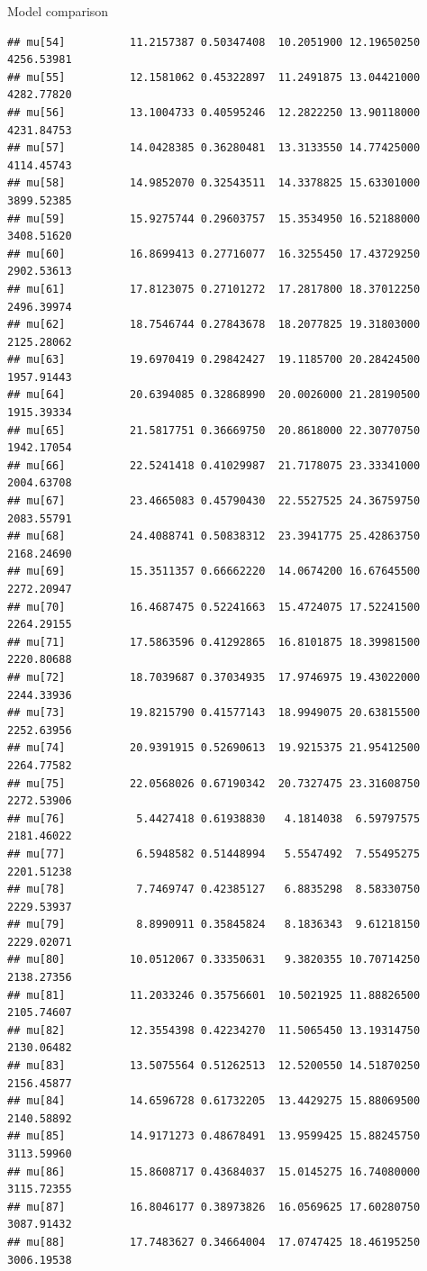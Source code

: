 \documentclass[
  ignorenonframetext,
]{beamer}
\begin{document}
\begin{frame}[fragile]{Model comparison}
\begin{verbatim}
## mu[54]          11.2157387 0.50347408  10.2051900 12.19650250 4256.53981
## mu[55]          12.1581062 0.45322897  11.2491875 13.04421000 4282.77820
## mu[56]          13.1004733 0.40595246  12.2822250 13.90118000 4231.84753
## mu[57]          14.0428385 0.36280481  13.3133550 14.77425000 4114.45743
## mu[58]          14.9852070 0.32543511  14.3378825 15.63301000 3899.52385
## mu[59]          15.9275744 0.29603757  15.3534950 16.52188000 3408.51620
## mu[60]          16.8699413 0.27716077  16.3255450 17.43729250 2902.53613
## mu[61]          17.8123075 0.27101272  17.2817800 18.37012250 2496.39974
## mu[62]          18.7546744 0.27843678  18.2077825 19.31803000 2125.28062
## mu[63]          19.6970419 0.29842427  19.1185700 20.28424500 1957.91443
## mu[64]          20.6394085 0.32868990  20.0026000 21.28190500 1915.39334
## mu[65]          21.5817751 0.36669750  20.8618000 22.30770750 1942.17054
## mu[66]          22.5241418 0.41029987  21.7178075 23.33341000 2004.63708
## mu[67]          23.4665083 0.45790430  22.5527525 24.36759750 2083.55791
## mu[68]          24.4088741 0.50838312  23.3941775 25.42863750 2168.24690
## mu[69]          15.3511357 0.66662220  14.0674200 16.67645500 2272.20947
## mu[70]          16.4687475 0.52241663  15.4724075 17.52241500 2264.29155
## mu[71]          17.5863596 0.41292865  16.8101875 18.39981500 2220.80688
## mu[72]          18.7039687 0.37034935  17.9746975 19.43022000 2244.33936
## mu[73]          19.8215790 0.41577143  18.9949075 20.63815500 2252.63956
## mu[74]          20.9391915 0.52690613  19.9215375 21.95412500 2264.77582
## mu[75]          22.0568026 0.67190342  20.7327475 23.31608750 2272.53906
## mu[76]           5.4427418 0.61938830   4.1814038  6.59797575 2181.46022
## mu[77]           6.5948582 0.51448994   5.5547492  7.55495275 2201.51238
## mu[78]           7.7469747 0.42385127   6.8835298  8.58330750 2229.53937
## mu[79]           8.8990911 0.35845824   8.1836343  9.61218150 2229.02071
## mu[80]          10.0512067 0.33350631   9.3820355 10.70714250 2138.27356
## mu[81]          11.2033246 0.35756601  10.5021925 11.88826500 2105.74607
## mu[82]          12.3554398 0.42234270  11.5065450 13.19314750 2130.06482
## mu[83]          13.5075564 0.51262513  12.5200550 14.51870250 2156.45877
## mu[84]          14.6596728 0.61732205  13.4429275 15.88069500 2140.58892
## mu[85]          14.9171273 0.48678491  13.9599425 15.88245750 3113.59960
## mu[86]          15.8608717 0.43684037  15.0145275 16.74080000 3115.72355
## mu[87]          16.8046177 0.38973826  16.0569625 17.60280750 3087.91432
## mu[88]          17.7483627 0.34664004  17.0747425 18.46195250 3006.19538

\end{verbatim}
\end{frame}
\end{document}
